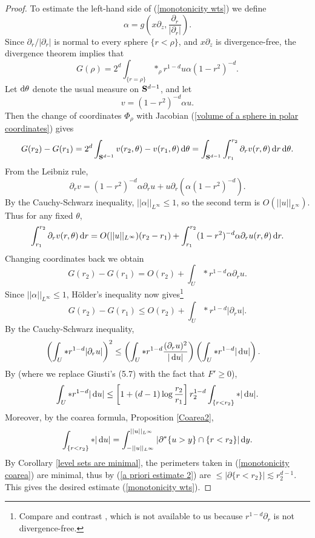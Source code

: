 \begin{proof}
To estimate the left-hand side of (\ref{monotonicity wts}) we define
$$\alpha = g\left(x \partial_z, \frac{\partial_r}{|\partial_r|}\right).$$
Since $\partial_r/|\partial_r|$ is normal to every sphere $\{r < \rho\}$, and $x\partial_z$ is divergence-free, the divergence theorem implies that 
$$G(\rho) = 2^d \int_{\{r = \rho\}} *_\rho r^{1 - d} u\alpha (1 - r^2)^{-d}.$$
Let $\mathop{}\!\mathrm{d} \theta$ denote the usual measure on $\mathbf S^{d - 1}$, and let
$$v = (1 - r^2)^{-d} \alpha u.$$
Then the change of coordinates $\Phi_\rho$ with Jacobian (\ref{volume of a sphere in polar coordinates}) gives
$$G(r_2) - G(r_1) = 2^d \int_{\mathbf S^{d - 1}} v(r_2, \theta) - v(r_1, \theta) \mathop{}\!\mathrm{d} \theta = \int_{\mathbf S^{d - 1}} \int_{r_1}^{r_2} \partial_r v(r, \theta) \mathop{}\!\mathrm{d} r \mathop{}\!\mathrm{d} \theta.$$
From the Leibniz rule,
$$\partial_r v = (1 - r^2)^{-d} \alpha \partial_r u + u\partial_r(\alpha(1 - r^2)^{-d}).$$
By the Cauchy-Schwarz inequality, $||\alpha||_{L^\infty} \leq 1$, so the second term is $O(||u||_{L^\infty})$. Thus for any fixed $\theta$,
$$\int_{r_1}^{r_2} \partial_r v(r, \theta) \mathop{}\!\mathrm{d} r = O(||u||_{L^\infty})(r_2 - r_1) + \int_{r_1}^{r_2} (1 - r^2)^{-d} \alpha \partial_r u(r, \theta) \mathop{}\!\mathrm{d} r.$$
Changing coordinates back we obtain 
$$G(r_2) - G(r_1) = O(r_2) + \int_U *r^{1 - d} \alpha \partial_r u.$$
Since $||\alpha||_{L^\infty} \leq 1$, H\"older's inequality now gives\footnote{Compare and contrast \cite[Lemma 5.3]{Giusti77}, which is not available to us because $r^{1 - d} \partial_r$ is not divergence-free.}
$$G(r_2) - G(r_1) \leq O(r_2) + \int_U *r^{1 - d} |\partial_r u|.$$
By the Cauchy-Schwarz inequality,
\begin{align*}
\left(\int_U *r^{1 - d} |\partial_r u| \right)^2 &\leq \left(\int_U *r^{1 - d}\frac{(\partial_ru)^2}{|\mathop{}\!\mathrm{d} u|}\right)\left(\int_U *r^{1 - d}|\mathop{}\!\mathrm{d} u|\right).
\end{align*}
By \cite[Lemma 5.11]{Giusti77} (where we replace Giusti's (5.7) with the fact that $F' \geq 0$),
$$\int_U *r^{1 - d}|\mathop{}\!\mathrm{d} u| \leq \left[1 + (d - 1) \log \frac{r_2}{r_1}\right] r_2^{1 - d} \int_{\{r < r_2\}} *|\mathop{}\!\mathrm{d} u|.$$
Moreover, by the coarea formula, Proposition \ref{Coarea2},
\begin{equation}\label{monotonicity coarea}
\int_{\{r < r_2\}} *|\mathop{}\!\mathrm{d} u| = \int_{-||u||_{L^\infty}}^{||u||_{L^\infty}} |\partial^* \{u > y\} \cap \{r < r_2\}| \mathop{}\!\mathrm{d} y.
\end{equation}
By Corollary \ref{level sets are minimal}, the perimeters taken in (\ref{monotonicity coarea}) are minimal, thus by (\ref{a priori estimate 2}) are $\leq |\partial \{r < r_2\}| \lesssim r_2^{d - 1}$.
This gives the desired estimate (\ref{monotonicity wts}).
\end{proof}


